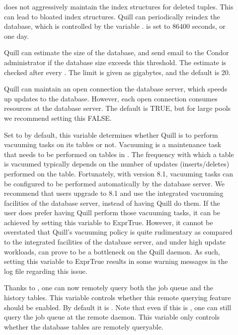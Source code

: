 \begin{description}
\item[]
 does not aggressively maintain the index structures for
deleted tuples. This can lead to bloated index structures.
Quill can periodically reindex the database, which is controlled by the
variable .
 is set to 86400 seconds, or one day.

\item[]
Quill can estimate the size of the database, and send email to the Condor
administrator if the database size exceeds this threshold. 
The estimate is checked after every .
The limit is given as gigabytes, and the default is 20.

\item[]
Quill can maintain an open connection the database server, which speeds up
updates to the database. 
However, each open connection consumes resources at the database server.
The default is TRUE, but for large pools we recommend setting this 
FALSE.

\item[]
Set to  by default, this variable determines whether Quill is to 
perform vacuuming tasks on its tables or not. Vacuuming is a maintenance 
task that needs to be performed on tables in . The 
frequency with which a table is vacuumed typically depends on the number 
of updates (inserts/deletes) performed on the table. Fortunately, with 
 version 8.1, vacuuming tasks can be configured to be 
performed automatically by the database server. We recommend that users 
upgrade to 8.1 and use the integrated vacuuming facilities of the database 
server, instead of having Quill do them. If the user does prefer having 
Quill perform those vacuuming tasks, it can be achieved by setting this 
variable to Expr{True}. However, it cannot be overstated that Quill's vacuuming 
policy is quite rudimentary as compared to the integrated facilities 
of the database server, and under high update workloads, can prove to 
be a bottleneck on the Quill daemon. As such, setting this variable to 
Expr{True} results in some warning messages in the log file regarding this 
issue.

\item[]
Thanks to 
,
one can now remotely query both the job queue and the
history tables. This variable controls whether this remote querying 
feature should be enabled.  By default it is .  Note that even if 
this is , one can still query the job queue 
at the remote  daemon.
This variable only controls whether the database tables are remotely queryable.


\end{description}
